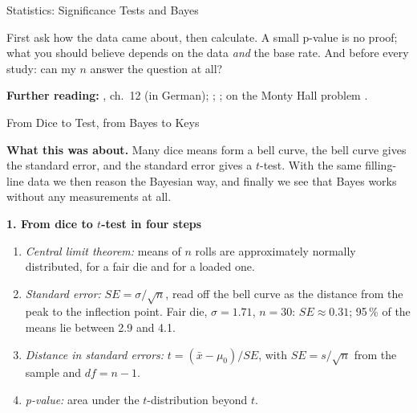 \begin{handout}{Statistics: Significance Tests and Bayes}
\begin{merkbox}
First ask how the data came about, then calculate. A small p-value is no
proof; what you should believe depends on the data \emph{and} the base
rate. And before every study: can my $n$ answer the question at all?
\end{merkbox}

\textbf{Further reading:} \textcite{doeringbortz2016}, ch.~12
(in German); \textcite{wagenmakers2007practical};
\textcite{gigerenzerhoffrage1995}; on the Monty Hall problem
\textcite{mhall_krauss2003}.
\end{handout}

\begin{handout}{From Dice to Test, from Bayes to Keys}

\textbf{What this was about.} Many dice means form a bell curve, the bell
curve gives the standard error, and the standard error gives a $t$-test.
With the same filling-line data we then reason the Bayesian way, and
finally we see that Bayes works without any measurements at all.

\textbf{1. From dice to $t$-test in four steps}
\begin{enumerate}\itemsep 0pt
  \item \emph{Central limit theorem:} means of $n$ rolls are approximately
    normally distributed, for a fair die and for a loaded one.
  \item \emph{Standard error:} $\mathit{SE}=\sigma/\sqrt{n}$, read off the
    bell curve as the distance from the peak to the inflection point. Fair
    die, $\sigma=1.71$, $n=30$: $\mathit{SE}\approx0.31$; 95\,\% of the
    means lie between 2.9 and 4.1.
  \item \emph{Distance in standard errors:} $t=(\bar{x}-\mu_0)/\mathit{SE}$,
    with $\mathit{SE}=s/\sqrt{n}$ from the sample and $\mathit{df}=n-1$.
  \item \emph{p-value:} area under the $t$-distribution beyond $t$.
\end{enumerate}


\end{handout}
